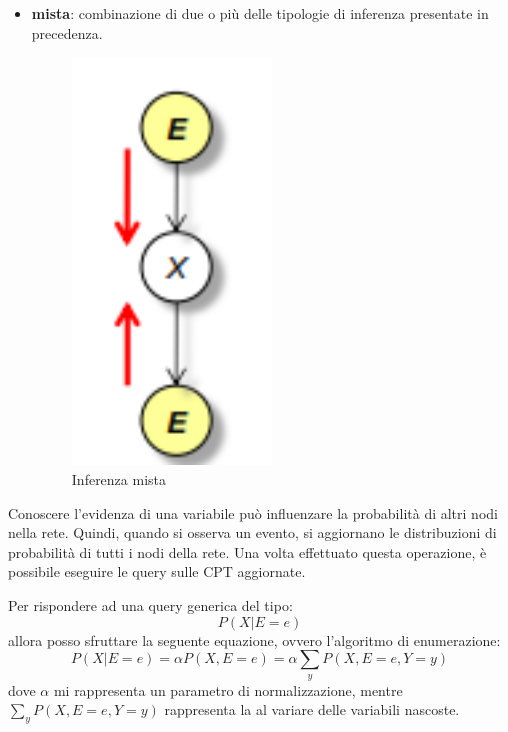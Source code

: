 \begin{itemize}
\begin{figure}
              \label{fig:intercausale}
          \end{figure}
    \item \textbf{mista}: combinazione di due o più delle tipologie di inferenza
          presentate in precedenza.
          \begin{figure}
              \centering
              \includegraphics[width=0.5\textwidth]{./img/Reti/Mista.png}
              \caption{Inferenza mista}
              \label{fig:mista}
          \end{figure}
\end{itemize}
Conoscere l'evidenza di una variabile può influenzare la probabilità di altri nodi
nella rete. Quindi, quando si osserva un evento, si aggiornano le distribuzioni
di probabilità di tutti i nodi della rete. Una volta effettuato questa operazione,
è possibile eseguire le query sulle CPT aggiornate.

Per rispondere ad una query generica del tipo:
\begin{equation*}
    P(X|E=e)
\end{equation*}
allora posso sfruttare la seguente equazione, ovvero l'algoritmo di enumerazione:
\begin{equation*}
    P(X|E=e) = \alpha P(X,E=e) = \alpha \sum_{y} P(X,E=e, Y=y)
\end{equation*}
dove $\alpha$ mi rappresenta un parametro di normalizzazione, mentre $\sum_{y}
    P(X,E = e, Y = y)$ rappresenta la al variare delle variabili nascoste.

